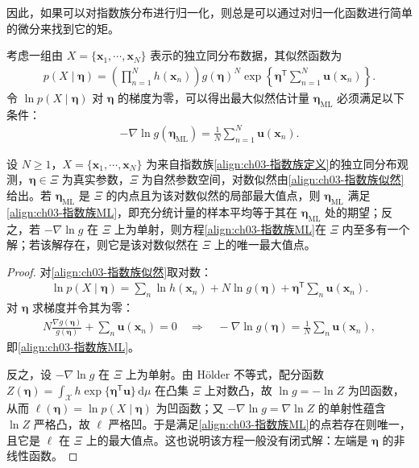 \documentclass[../../main.tex]{subfiles}
\begin{document}
因此，如果可以对指数族分布进行归一化，则总是可以通过对归一化函数进行简单的微分来找到它的矩。

考虑一组由 $X=\{\boldsymbol{x}_1,\cdots,\boldsymbol{x}_N\}$ 表示的独立同分布数据，其似然函数为
\begin{align}
p(X\mid\boldsymbol{\eta})=\left(\prod_{n=1}^{N}h(\boldsymbol{x}_n)\right)g(\boldsymbol{\eta})^{N}\exp\left\{\boldsymbol{\eta}^{\mathsf{T}}\sum_{n=1}^{N}\boldsymbol{u}(\boldsymbol{x}_n)\right\}.
\label{align:ch03-指数族似然}
\end{align}
令 $\ln p(X\mid\boldsymbol{\eta})$ 对 $\boldsymbol{\eta}$ 的梯度为零，可以得出最大似然估计量 $\boldsymbol{\eta}_{\mathrm{ML}}$ 必须满足以下条件：
\begin{align}
-\nabla\ln g(\boldsymbol{\eta}_{\mathrm{ML}})=\frac{1}{N}\sum_{n=1}^{N}\boldsymbol{u}(\boldsymbol{x}_n).
\label{align:ch03-指数族ML}
\end{align}

\begin{proposition}[指数族分布的最大似然估计]\label{proposition:ch03-指数族最大似然}
设 $N\geqslant1$，$X=\{\boldsymbol{x}_1,\cdots,\boldsymbol{x}_N\}$ 为来自指数族\eqref{align:ch03-指数族定义}的独立同分布观测，$\boldsymbol{\eta}\in\Xi$ 为真实参数，$\Xi$ 为自然参数空间，对数似然由\eqref{align:ch03-指数族似然}给出。若 $\boldsymbol{\eta}_{\mathrm{ML}}$ 是 $\Xi$ 的内点且为该对数似然的局部最大值点，则 $\boldsymbol{\eta}_{\mathrm{ML}}$ 满足\eqref{align:ch03-指数族ML}，即充分统计量的样本平均等于其在 $\boldsymbol{\eta}_{\mathrm{ML}}$ 处的期望；反之，若 $-\nabla\ln g$ 在 $\Xi$ 上为单射，则方程\eqref{align:ch03-指数族ML}在 $\Xi$ 内至多有一个解；若该解存在，则它是该对数似然在 $\Xi$ 上的唯一最大值点。
\end{proposition}
\begin{proof}
对\eqref{align:ch03-指数族似然}取对数：
\begin{align*}
\ln p(X\mid\boldsymbol{\eta})=\sum_{n}\ln h(\boldsymbol{x}_n)+N\ln g(\boldsymbol{\eta})+\boldsymbol{\eta}^{\mathsf{T}}\sum_{n}\boldsymbol{u}(\boldsymbol{x}_n).
\end{align*}
对 $\boldsymbol{\eta}$ 求梯度并令其为零：
\begin{align*}
N\frac{\nabla g(\boldsymbol{\eta})}{g(\boldsymbol{\eta})}+\sum_{n}\boldsymbol{u}(\boldsymbol{x}_n)=0\quad\Longrightarrow\quad-\nabla\ln g(\boldsymbol{\eta})=\frac{1}{N}\sum_{n}\boldsymbol{u}(\boldsymbol{x}_n),
\end{align*}
即\eqref{align:ch03-指数族ML}。

反之，设 $-\nabla\ln g$ 在 $\Xi$ 上为单射。由 Hölder 不等式，配分函数 $Z(\boldsymbol{\eta})=\int_{\mathcal{X}}h\exp\{\boldsymbol{\eta}^{\mathsf{T}}\boldsymbol{u}\}\,\mathrm{d}\mu$ 在凸集 $\Xi$ 上对数凸，故 $\ln g=-\ln Z$ 为凹函数，从而 $\ell(\boldsymbol{\eta})=\ln p(X\mid\boldsymbol{\eta})$ 为凹函数；又 $-\nabla\ln g=\nabla\ln Z$ 的单射性蕴含 $\ln Z$ 严格凸，故 $\ell$ 严格凹。于是满足\eqref{align:ch03-指数族ML}的点若存在则唯一，且它是 $\ell$ 在 $\Xi$ 上的最大值点。这也说明该方程一般没有闭式解：左端是 $\boldsymbol{\eta}$ 的非线性函数。
\end{proof}
\end{document}
